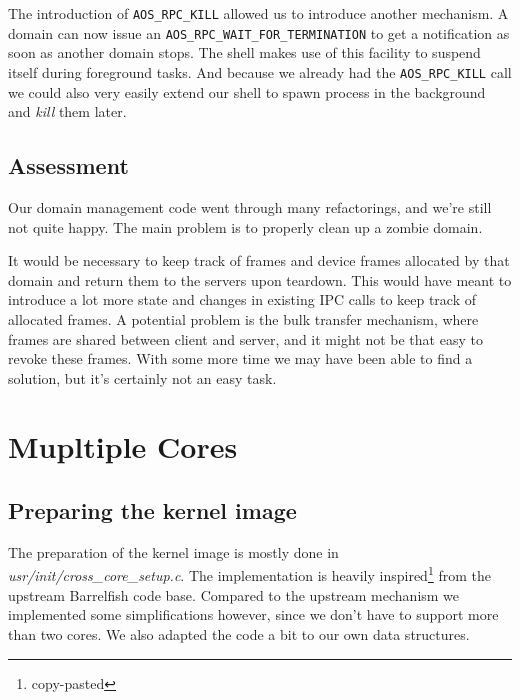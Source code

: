 \documentclass[a4paper,10pt]{article}
\newcommand{\filepath}[1]{\emph{ #1}}
\begin{document}
The introduction of \lstinline!AOS_RPC_KILL! allowed us to introduce another mechanism.
A domain can now issue an \lstinline!AOS_RPC_WAIT_FOR_TERMINATION! to get a notification as soon as another domain stops.
The shell makes use of this facility to suspend itself during foreground tasks.
And because we already had the \lstinline!AOS_RPC_KILL! call we could also very easily extend our shell to spawn process in the background and \emph{kill} them later.

\subsection{Assessment}
Our domain management code went through many refactorings, and we're still not quite happy.
The main problem is to properly clean up a zombie domain.

It would be necessary to keep track of frames and device frames allocated by that domain and return them to the servers upon teardown.
This would have meant to introduce a lot more state and changes in existing IPC calls to keep track of allocated frames.
A potential problem is the bulk transfer mechanism, where frames are shared between client and server, and it might not be that easy to revoke these frames.
With some more time we may have been able to find a solution, but it's certainly not an easy task.


\section{Mupltiple Cores}

\subsection{Preparing the kernel image}

The preparation of the kernel image is mostly done in \filepath{usr/init/cross\_core\_setup.c}.
The implementation is heavily inspired\footnote{copy-pasted} from the upstream Barrelfish code base.
Compared to the upstream mechanism we implemented some simplifications however, since we don't have to support more than two cores.
We also adapted the code a bit to our own data structures.
\end{document}
